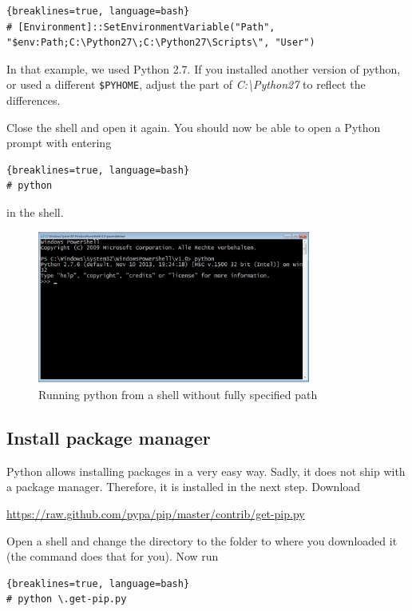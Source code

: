 \begin{lstlisting}{breaklines=true, language=bash}
# [Environment]::SetEnvironmentVariable("Path", "$env:Path;C:\Python27\;C:\Python27\Scripts\", "User")
\end{lstlisting}

In that example, we used Python 2.7. If you installed another version of python, or used a different \texttt{\$PYHOME}, adjust the part of \textit{C:\textbackslash Python27} to reflect the differences. 

Close the shell and open it again. You should now be able to open a Python prompt with entering

\begin{lstlisting}{breaklines=true, language=bash}
# python
\end{lstlisting}

in the shell. 

\begin{figure}[ht]
    \centering
    \includegraphics[width=0.8\textwidth]{img/install-python.png}
    \caption{Running python from a shell without fully specified path}
    \label{fig:install-python}
\end{figure}

\subsection{Install package manager}

Python allows installing packages in a very easy way. Sadly, it does not ship with a package manager. Therefore, it is installed in the next step. Download

\url{https://raw.github.com/pypa/pip/master/contrib/get-pip.py}

Open a shell and change the directory to the folder to where you downloaded it (the  command does that for you). Now run 

\begin{lstlisting}{breaklines=true, language=bash}
# python \.get-pip.py
\end{lstlisting}

